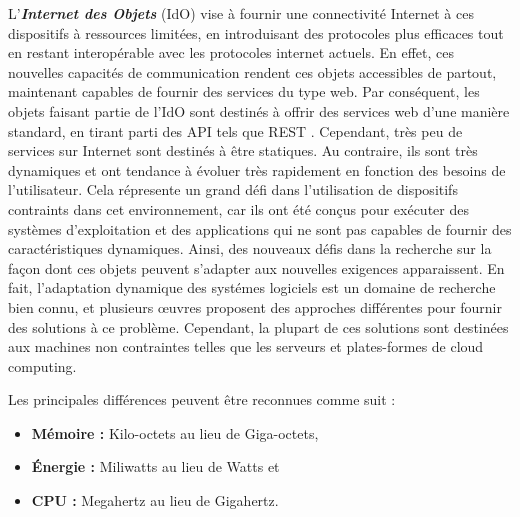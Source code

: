 L'\textbf{\textit{Internet des Objets}} (IdO) vise \`a fournir une connectivit\'e Internet \`a ces dispositifs \`a ressources limit\'ees, en introduisant des protocoles plus efficaces tout en restant interop\'erable avec les protocoles internet actuels.
En effet, ces nouvelles capacit\'es de communication rendent ces objets accessibles de partout, maintenant capables de fournir des services du type web.
Par cons\'equent, les objets faisant partie de l'IdO sont destin\'es \`a offrir des services web d'une manière standard, en tirant parti des API tels que REST \cite{Fielding02REST}.
Cependant, tr\`es peu de services sur Internet sont destin\'es \`a \^etre statiques.
Au contraire, ils sont tr\`es dynamiques et ont tendance \`a \'evoluer tr\`es rapidement en fonction des besoins de l'utilisateur.
Cela r\'epresente un grand d\'efi dans l'utilisation de dispositifs contraints dans cet environnement, car ils ont \'et\'e con\c{c}us pour ex\'ecuter des systèmes d'exploitation et des applications qui ne sont pas capables de fournir des caractéristiques dynamiques.
Ainsi, des nouveaux d\'efis dans la recherche sur la fa\c{c}on dont ces objets peuvent s'adapter aux nouvelles exigences apparaissent.
En fait, l'adaptation dynamique des syst\'emes logiciels est un domaine de recherche bien connu, et plusieurs \oe{}uvres proposent des approches diff\'erentes pour fournir des solutions \`a ce probl\`eme.
Cependant, la plupart de ces solutions sont destin\'ees aux machines non contraintes telles que les serveurs et plates-formes de cloud computing.

Les principales diff\'erences peuvent \^etre reconnues comme suit :

\begin{itemize}
	\item \textbf{M\'emoire : } Kilo-octets au lieu de Giga-octets,
	\item \textbf{\'Energie : } Miliwatts au lieu de Watts et 
	\item \textbf{CPU : } Megahertz au lieu de Gigahertz.
\end{itemize}

